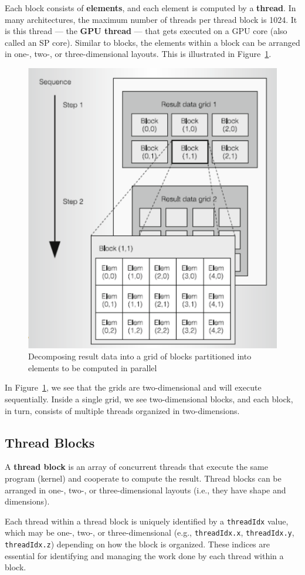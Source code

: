 \documentclass[12pt]{book}
\begin{document}
Each block consists of \textbf{elements}, and each element is computed by a \textbf{thread}. In many architectures, the maximum number of threads per thread block is 1024. It is this thread — the \textbf{GPU thread} — that gets executed on a GPU core (also called an SP core). Similar to blocks, the elements within a block can be arranged in one-, two-, or three-dimensional layouts. This is illustrated in Figure~\ref{fig:cuda_layout}.
\begin{figure}[ht]
    \centering
    \includegraphics[width=0.5\linewidth]{images/Cuda_layout.png}
    \caption{Decomposing result data into a grid of blocks partitioned into elements to be computed in parallel}
    \label{fig:cuda_layout}
\end{figure}

In Figure~\ref{fig:cuda_layout}, we see that the grids are two-dimensional and will execute sequentially. Inside a single grid, we see two-dimensional blocks, and each block, in turn, consists of multiple threads organized in two-dimensions.

\subsection{Thread Blocks}
A \textbf{thread block} is an array of concurrent threads that execute the same program (kernel) and cooperate to compute the result. Thread blocks can be arranged in one-, two-, or three-dimensional layouts (i.e., they have shape and dimensions).

Each thread within a thread block is uniquely identified by a \texttt{threadIdx} value, which may be one-, two-, or three-dimensional (e.g., \texttt{threadIdx.x}, \texttt{threadIdx.y}, \texttt{threadIdx.z}) depending on how the block is organized. These indices are essential for identifying and managing the work done by each thread within a block.
\end{document}
